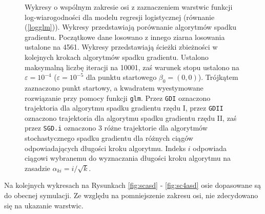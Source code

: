 \begin{figure}[h!]
\begin{center}
\end{center}
\caption[Porównanie algorytmów spadku gradientu o wspólnym zakresie osi.]{\label{fig:sc5asd} Wykresy o wspólnym zakresie osi z zaznaczeniem warstwic funkcji log-wiarogodności dla modelu regresji logistycznej (równanie (\ref{logglm})). Wykresy przedstawiają porównanie algorytmów spadku gradientu. Początkowe dane losowano z innego ziarna losowania ustalone na 4561. Wykresy przedstawiają ścieżki zbieżności w kolejnych krokach algorytmów spadku gradientu. Ustalono maksymalną liczbę iteracji na 10001, zaś warunek stopu ustalono na $\varepsilon=10^{-4}$ ($\varepsilon=10^{-5}$ dla punktu startowego $\beta_0 = (0,0)$). Trójkątem zaznaczono punkt startowy, a kwadratem wyestymowane rozwiązanie przy pomocy funkcji \texttt{glm}. Przez \texttt{GDI} oznaczono trajektoria dla algorytmu spadku gradientu rzędu I, przez \texttt{GDII} oznaczono trajektoria dla algorytmu spadku gradientu rzędu II, zaś przez \texttt{SGD.i} oznaczono 3 różne trajektorie dla algorytmów stochastycznego spadku gradientu dla różnych ciągów odpowiadających długości kroku algorytmu. Indeks $i$ odpowiada ciągowi wybranemu do wyznaczania długości kroku algorytmu na zasadzie $\alpha_{ki} = i/\sqrt{k}$.}
\end{figure}

Na kolejnych wykresach na Rysunkach \ref{fig:scasd} - \ref{fig:sc4asd} osie dopasowane są do obecnej symulacji. Ze względu na pomniejszenie zakresu osi, nie zdecydowano się na ukazanie warstwic.

\newpage

